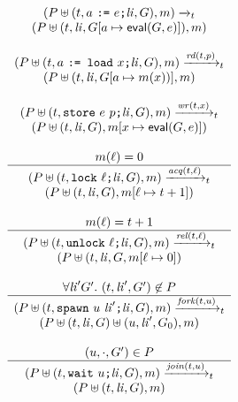 \documentclass[preprint, 10pt]{sigplanconf}
\newcommand{\assign}[2]{#1\ \texttt{:=}\ #2}
\newcommand{\load}[2]{#1\ \texttt{:= load}\ #2}
\newcommand{\store}[2]{\texttt{store}\ #2\ #1}
\newcommand{\lock}[1]{\texttt{lock}\ #1}
\newcommand{\unlock}[1]{\texttt{unlock}\ #1}
\newcommand{\spawn}[2]{\texttt{spawn}\ #1\ #2}
\newcommand{\wait}[1]{\texttt{wait}\ #1}
\newcommand{\cfg}[2]{\ensuremath{(#1, #2)}}
\newcommand{\anarrow}[2]{\ensuremath{\xrightarrow{#2}_{#1}}}
\begin{document}
\begin{figure}[tb]
\[
\begin{array}{c}
 \cfg{P \uplus (t, \assign{a}{e}\texttt{;} \mathit{li}, G)}{m}  
\anarrow{t}{} \\
\cfg{P \uplus (t, \mathit{li}, G[a \mapsto \mathsf{eval}(G, e)])}{m}
\\\\

\cfg{P \uplus (t, \load{a}{x}\texttt{;} \mathit{li}, G)}{m}  
\anarrow{t}{\mathit{rd}(t, p)} \\
\cfg{P \uplus (t, \mathit{li}, G[a \mapsto m(x))]}{m}
\\\\

\cfg{P \uplus (t, \store{p}{e}\texttt{;} \mathit{li}, G)}{m} 
\anarrow{t}{\mathit{wr}(t, x)} \\
\cfg{P \uplus (t, \mathit{li}, G)}{m[x \mapsto \mathsf{eval}(G, e)]}
\\\\

\multicolumn{1}{c}{m(\ell) = 0}
\\ \hline
\cfg{P \uplus (t, \lock{\ell}\texttt{;} \mathit{li}, G)}{m}
 \anarrow{t}{\mathit{acq}(t, \ell)} \\
\cfg{P \uplus (t, \mathit{li}, G)}{m[\ell \mapsto t + 1]}
\\\\

\multicolumn{1}{c}{m(\ell) = t + 1} 
\\ \hline
\cfg{P \uplus (t, \unlock{\ell}\texttt{;} \mathit{li}, G)}{m}
\anarrow{t}{\mathit{rel}(t, \ell)} \\
\cfg{P \uplus (t, \mathit{li}, G}{m[\ell \mapsto 0]}
\\\\

\multicolumn{1}{c}{\forall \mathit{li}' G'.\ (t, \mathit{li}', G') \not\in P}
\\ \hline \rule{0pt}{2.5ex}
\cfg{P \uplus (t, \spawn{u}{\mathit{li}'}\texttt{;} \mathit{li}, G)}{m}
\anarrow{t}{\mathit{fork}(t, u)} \\
\cfg{P \uplus (t, \mathit{li}, G) \uplus (u, \mathit{li}', G_0)}{m}
\\\\

\multicolumn{1}{c}{(u, \cdot, G') \in P}
\\ \hline \rule{0pt}{2.5ex}
\cfg{P \uplus (t, \wait{u}\texttt{;} \mathit{li}, G)}{m}
 \anarrow{t}{\mathit{join}(t, u)} \\
\cfg{P \uplus (t, \mathit{li}, G)}{m}
\\\\


\end{array}\]
\end{figure}
\end{document}
